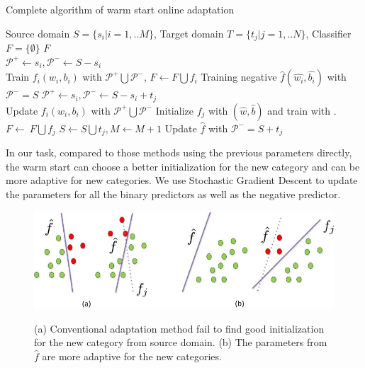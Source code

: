 \begin{algorithm}
  \caption{Complete algorithm of warm start online adaptation}\label{algo:ws}
  \begin{algorithmic}[1]
    \REQUIRE Source domain $S = \{ {s_i}|i = 1,..M\} $, Target domain $T = \{ {t_j}|j = 1,..N\} $, Classifier $F = \{\emptyset\}$
    \ENSURE $F$\\
         \STATE $\mathcal{P^+}\leftarrow s_i, \mathcal{P^-}\leftarrow S-s_i$\\
          Train ${{f_i}\left( {{w_i},{b_i}} \right)}$ with $\mathcal{P^+}\bigcup\mathcal{P^-}$, $F\leftarrow F\bigcup f_i$
    \ENDFOR
    \STATE Training negative $\hat{f}\left( {\hat{w_i},\hat{b_i}} \right)$ with $\mathcal{P^-}=S$
             \STATE $\mathcal{P^+}\leftarrow s_i, \mathcal{P^-}\leftarrow S-s_i+t_j$ \\
              Update ${{f_i}\left( {{w_i},{b_i}} \right)}$ with $\mathcal{P^+}\bigcup\mathcal{P^-}$
        \ENDFOR
        \STATE Initialize $f_j$ with $(\hat{w},\hat{b})$ and train with .
        \STATE $F\leftarrow\ F\bigcup f_j$
        \STATE $S\leftarrow S\bigcup t_j, M\leftarrow M+1$
        \STATE Update $\hat{f}$ with $\mathcal{P^-}=S+t_j$
     \ENDWHILE
  \end{algorithmic}
\end{algorithm}

In our task, compared to those methods using the previous parameters directly, the warm start can choose a better initialization for the new category and can be more adaptive for new categories. We use Stochastic Gradient Descent to update the parameters for all the binary predictors as well as the negative predictor.
\begin{figure}
  \centering
  \includegraphics[scale = .6]{fig/domain.jpg}\\
  \caption{(a) Conventional adaptation method fail to find good initialization for the new category from source domain. (b) The parameters from $\hat{f}$ are more adaptive for the new categories.}
  \label{fig:wm}
\end{figure}
